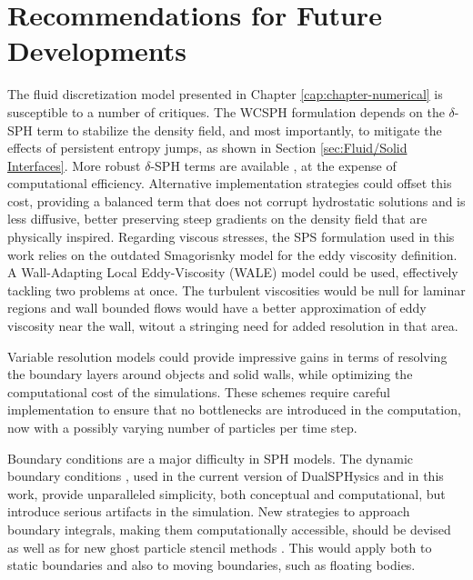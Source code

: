 \section{Recommendations for Future Developments}

The fluid discretization model presented in Chapter \ref{cap:chapter-numerical} is susceptible to a number of critiques. The \ac{WCSPH} formulation depends on the $\delta$-SPH term to stabilize the density field, and most importantly, to mitigate the effects of persistent entropy jumps, as shown in Section \ref{sec:Fluid/Solid Interfaces}. More robust $\delta$-SPH terms are available \citep{Antuono-2012}, at the expense of computational efficiency. Alternative implementation strategies could offset this cost, providing a balanced term that does not corrupt hydrostatic solutions and is less diffusive, better preserving steep gradients on the density field that are physically inspired. Regarding viscous stresses, the \ac{SPS} formulation used in this work relies on the outdated Smagorisnky model for the eddy viscosity definition. A Wall-Adapting Local Eddy-Viscosity (WALE) model could be used, effectively tackling two problems at once. The turbulent viscosities would be null for laminar regions and wall bounded flows would have a better approximation of eddy viscosity near the wall, witout a stringing need for added resolution in that area. 

Variable resolution models \citep{Vacondio-2013} could provide impressive gains in terms of resolving the boundary layers around objects and solid walls, while optimizing the computational cost of the simulations. These schemes require careful implementation to ensure that no bottlenecks are introduced in the computation, now with a possibly varying number of particles per time step.

Boundary conditions are a major difficulty in \ac{SPH} models. The dynamic boundary conditions \citep{Crespo-2007}, used in the current version of DualSPHysics and in this work, provide unparalleled simplicity, both conceptual and computational, but introduce serious artifacts in the simulation. New strategies to approach boundary integrals, making them computationally accessible, should be devised as well as for new ghost particle stencil methods \citep{Fourtakas-2014}.  This would apply both to static boundaries and also to moving boundaries, such as floating bodies.

